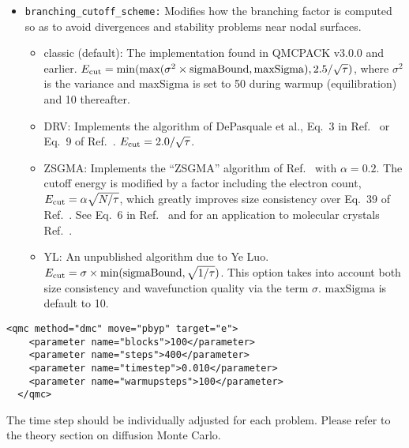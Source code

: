 \begin{itemize}


\item \texttt{branching\_cutoff\_scheme:} Modifies how the branching factor is computed so as to avoid divergences and stability
problems near nodal surfaces. 
\begin{itemize}
  \item classic (default): The implementation found in QMCPACK v3.0.0 and earlier.
	  $E_{\rm cut}=\mathrm{min}(\mathrm{max}(\sigma^2 \times \mathrm{sigmaBound},\mathrm{maxSigma}),2.5/\sqrt{\tau})$,
  where $\sigma^2$ is the variance and $\mathrm{maxSigma}$ is set to 50 during warmup (equilibration) and 10 thereafter.
  \item DRV: Implements the algorithm of DePasquale et al., Eq.~3 in Ref.~\cite{DePasqualeReliable1988} or Eq.~9 of Ref.~\cite{Umrigar1993}.
  $E_{\rm cut}=2.0/\sqrt{\tau}$.
  \item ZSGMA: Implements the ``ZSGMA'' algorithm of Ref.~\cite{ZenBoosting2016} with $\alpha=0.2$. The cutoff energy is modified by a factor including the
  electron count, $E_{\rm cut}=\alpha \sqrt{N/\tau}$, which greatly improves size consistency over Eq.~39 of Ref.~\cite{Umrigar1993}. See Eq.~6 in Ref.~\cite{ZenBoosting2016} and for
  an application to molecular crystals Ref.~\cite{ZenFast2018}.
  \item YL: An unpublished algorithm due to Ye Luo. $E_{\rm cut}=\sigma\times\mathrm{min}(\mathrm{sigmaBound},\sqrt{1/\tau})$. This option takes into account both size consistency and wavefunction quality via the term $\sigma$. $\mathrm{maxSigma}$ is default to 10.
\end{itemize}

\end{itemize}

\begin{lstlisting}[style=QMCPXML,caption=The following is an example of a very simple DMC section. ]
  <qmc method="dmc" move="pbyp" target="e">
    <parameter name="blocks">100</parameter>
    <parameter name="steps">400</parameter>
    <parameter name="timestep">0.010</parameter>
    <parameter name="warmupsteps">100</parameter>
  </qmc>
\end{lstlisting}
The time step should be individually adjusted for each problem.  Please refer to the theory section
on diffusion Monte Carlo.


